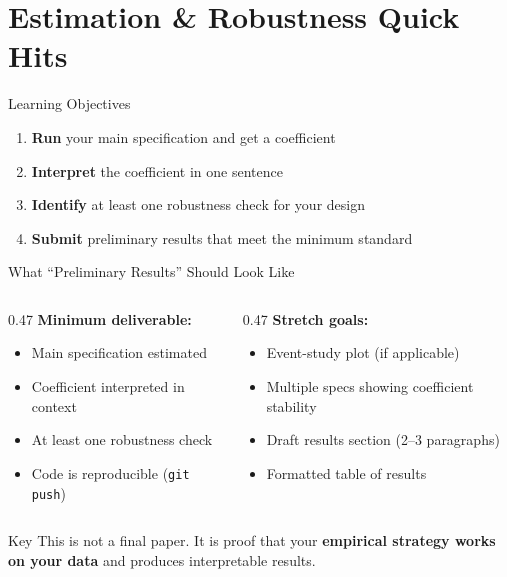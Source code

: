 
\section{Estimation \& Robustness Quick Hits}

\begin{frame}{Learning Objectives}
  \begin{enumerate}
    \item \textbf{Run} your main specification and get a coefficient
    \item \textbf{Interpret} the coefficient in one sentence
    \item \textbf{Identify} at least one robustness check for your design
    \item \textbf{Submit} preliminary results that meet the minimum standard
  \end{enumerate}
\end{frame}

\begin{frame}{What ``Preliminary Results'' Should Look Like}
  \begin{columns}[T]
    \begin{column}{0.47\textwidth}
      \textbf{\textcolor{usfgreen}{Minimum deliverable:}}
      \begin{itemize}
        \item Main specification estimated
        \item Coefficient interpreted in context
        \item At least one robustness check
        \item Code is reproducible (\texttt{git push})
      \end{itemize}
    \end{column}
    \begin{column}{0.47\textwidth}
      \textbf{Stretch goals:}
      \begin{itemize}
        \item Event-study plot (if applicable)
        \item Multiple specs showing coefficient stability
        \item Draft results section (2--3 paragraphs)
        \item Formatted table of results
      \end{itemize}
    \end{column}
  \end{columns}

  \vspace{8pt}

  \begin{block}{Key}
    This is not a final paper. It is proof that your \textbf{empirical strategy works on your data} and produces interpretable results.
  \end{block}
\end{frame}

